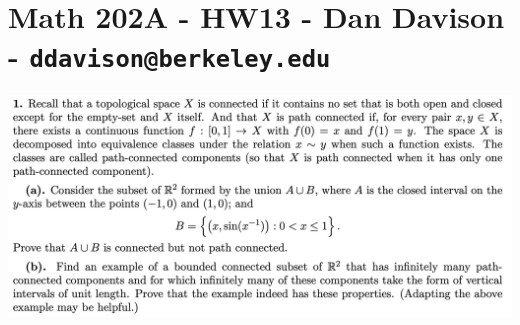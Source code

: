 \section*{Math 202A - HW13 - Dan Davison - \texttt{ddavison@berkeley.edu}}

\begin{mdframed}
\includegraphics[width=400pt]{img/analysis--berkeley-202a-hw13-26dd.png}
\end{mdframed}

